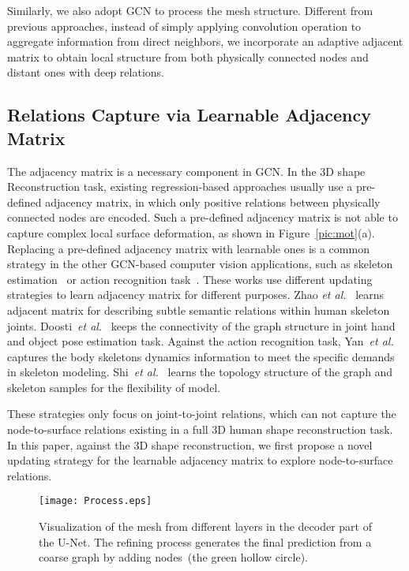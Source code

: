 \documentclass[sigplan]{acmart}
\def\etal{\emph{et al.}}
\begin{document}
Similarly, we also adopt GCN to process the mesh structure. Different from previous approaches, instead of simply applying convolution operation to aggregate information from direct neighbors, we incorporate an adaptive adjacent matrix to obtain local structure from both physically connected nodes and distant ones with deep relations.

\subsection{Relations Capture via Learnable Adjacency Matrix}
\label{relate:a}
The adjacency matrix is a necessary component in GCN. In the 3D shape Reconstruction task, existing regression-based approaches usually use a pre-defined adjacency matrix, in which only positive relations between physically connected nodes are encoded. Such a pre-defined adjacency matrix is not able to capture complex local surface deformation, as shown in Figure~\ref{pic:mot}(a). Replacing a pre-defined adjacency matrix with learnable ones is a common strategy in the other GCN-based computer vision applications, such as skeleton estimation~\cite{zhaoCVPR19semantic,Doosti_2020_CVPR} or action recognition task~\cite{adpAR_cvpr19,aaai_18_adp}. These works use different updating strategies to learn adjacency matrix for different purposes. Zhao \etal~\cite{zhaoCVPR19semantic} learns adjacent matrix for describing subtle semantic relations within human skeleton joints. Doosti~\etal~\cite{Doosti_2020_CVPR} keeps the connectivity of the graph structure in joint hand and object pose estimation task. Against the action recognition task, Yan~\etal~\cite{aaai_18_adp} captures the body skeletons dynamics information to meet the specific demands in skeleton modeling. Shi~\etal~\cite{adpAR_cvpr19} learns the topology structure of the graph and skeleton samples for the flexibility of model.

These strategies only focus on joint-to-joint relations, which can not capture the node-to-surface relations existing in a full 3D human shape reconstruction task. In this paper, against the 3D shape reconstruction, we first propose a novel updating strategy for the learnable adjacency matrix to explore node-to-surface relations.

\begin{figure*}[]
\centering
\texttt{[image: Process.eps]}
\caption{Visualization of the mesh from different layers in the decoder part of the U-Net. The refining process generates the final prediction from a coarse graph by adding nodes~(the green hollow circle).}
\label{pic:Process}
\end{figure*} 
\end{document}
